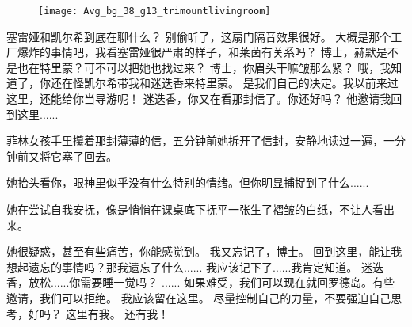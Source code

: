 \documentclass[openany]{book}
\begin{document}
\begin{figure}[h]
    \centering
    \texttt{[image: Avg\_bg\_38\_g13\_trimountlivingroom]}
\end{figure}
\begin{dialogue}
     塞雷娅和凯尔希到底在聊什么？
     别偷听了，这扇门隔音效果很好。
     大概是那个工厂爆炸的事情吧，我看塞雷娅很严肃的样子，和莱茵有关系吗？
     博士，赫默是不是也在特里蒙？可不可以把她也找过来？
     博士，你眉头干嘛皱那么紧？
     哦，我知道了，你还在怪凯尔希带我和迷迭香来特里蒙。
     是我们自己的决定。我以前来过这里，还能给你当导游呢！
     迷迭香，你又在看那封信了。你还好吗？
     他邀请我回到这里......\par
    菲林女孩手里攥着那封薄薄的信，五分钟前她拆开了信封，安静地读过一遍，一分钟前又将它塞了回去。\par
    她抬头看你，眼神里似乎没有什么特别的情绪。但你明显捕捉到了什么......\par
    她在尝试自我安抚，像是悄悄在课桌底下抚平一张生了褶皱的白纸，不让人看出来。\par
    她很疑惑，甚至有些痛苦，你能感觉到。
     我又忘记了，博士。
     回到这里，能让我想起遗忘的事情吗？那我遗忘了什么......
     我应该记下了......我肯定知道。
     迷迭香，放松......你需要睡一觉吗？
     ......
     如果难受，我们可以现在就回罗德岛。有些邀请，我们可以拒绝。
     我应该留在这里。
     尽量控制自己的力量，不要强迫自己思考，好吗？
     这里有我。
     还有我！
\end{dialogue}
\end{document}
